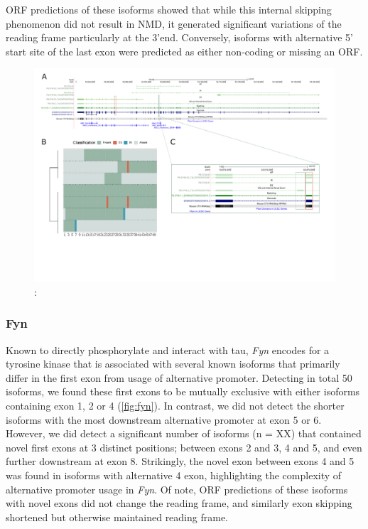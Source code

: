 ORF predictions of these isoforms showed that while this internal skipping phenomenon did not result in NMD, it generated significant variations of the reading frame particularly at the 3'end. Conversely, isoforms with alternative 5' start site of the last exon were predicted as either non-coding or missing an ORF.

\begin{landscape}
	\begin{figure}[htp]
		\begin{center}
			\includegraphics[page=15,trim={0 1cm 0 0},scale = 0.85]{Figures/TargetGenes_Annotation_Landscape.pdf}
		\end{center}
		\captionsetup{width=0.95\textwidth}
		\caption[RNA-Seq defined transcriptome]%
		{\textbf{}: }   
		\label{fig:vgf}
	\end{figure}
\end{landscape} 

\newpage
\subsubsection{Fyn}
Known to directly phosphorylate and interact with tau, \textit{Fyn} encodes for a tyrosine kinase that is associated with several known isoforms that primarily differ in the first exon from usage of alternative promoter. Detecting in total 50 isoforms, we found these first exons to be mutually exclusive with either isoforms containing exon 1, 2 or 4 (\cref{fig:fyn}). In contrast, we did not detect the shorter isoforms with the most downstream alternative promoter at exon 5 or 6. However, we did detect a significant number of isoforms (n = XX) that contained novel first exons at 3 distinct positions; between exons 2 and 3, 4 and 5, and even further downstream at exon 8. Strikingly, the novel exon between exons 4 and 5 was found in isoforms with alternative 4 exon, highlighting the complexity of alternative promoter usage in \textit{Fyn}. Of note, ORF predictions of these isoforms with novel exons did not change the reading frame, and similarly exon skipping shortened but otherwise maintained reading frame.  


